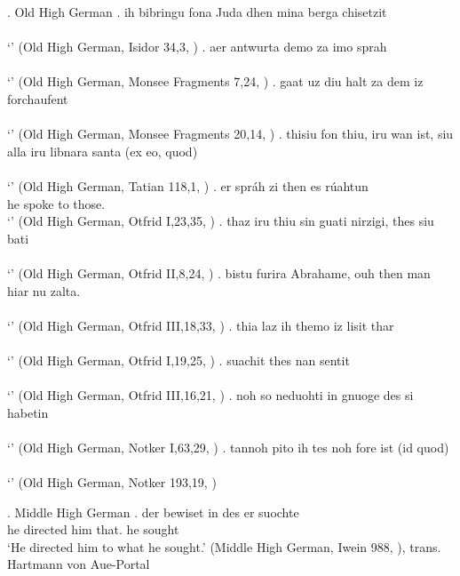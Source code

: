 \ex. Old High German
\ag. ih bibringu fona Juda dhen mina berga chisetzit\\
 \\
 `' \hfill (Old High German, Isidor 34,3, \citealt[761]{behaghel1923})
\bg. aer antwurta demo za imo sprah\\
 \\
 `' \hfill (Old High German, Monsee Fragments 7,24, \citealt[761]{behaghel1923})
\bg. gaat uz diu halt za dem iz forchaufent\\
 \\
 `' \hfill (Old High German, Monsee Fragments 20,14, \citealt[761]{behaghel1923})
\bg. thisiu fon thiu, iru wan ist, siu alla iru libnara santa (ex eo, quod)\\
 \\
 `' \hfill (Old High German, Tatian 118,1, \citealt[761]{behaghel1923})
\bg. er spráh zi then es rúahtun\\
 he spoke to those.\\
 `' \hfill (Old High German, Otfrid I,23,35, \citealt[761]{behaghel1923})
\bg. thaz iru thiu sin guati nirzigi, thes siu bati\\
 \\
 `' \hfill (Old High German, Otfrid II,8,24, \citealt[761]{behaghel1923})
\bg. bistu furira Abrahame, ouh then man hiar nu zalta.\\
 \\
 `' \hfill (Old High German, Otfrid III,18,33, \citealt[761]{behaghel1923})
\bg. thia laz ih themo iz lisit thar\\
 \\
 `' \hfill (Old High German, Otfrid I,19,25, \citealt[761]{behaghel1923})
\bg. suachit thes nan sentit\\
 \\
 `' \hfill (Old High German, Otfrid III,16,21, \citealt[761]{behaghel1923})
\bg. noh so neduohti in gnuoge des si habetin\\
 \\
 `' \hfill (Old High German, Notker I,63,29, \citealt[761]{behaghel1923})
\bg. tannoh pito ih tes noh fore ist (id quod)\\
 \\
 `' \hfill (Old High German, Notker 193,19, \citealt[761]{behaghel1923})


\ex. Middle High German
\ag. der bewiset in des er suochte\\
 he directed him {that}. he sought\\
 `He directed him to what he sought.' \hfill (Middle High German, Iwein 988, \citealt[761]{behaghel1923}), trans. Hartmann von Aue-Portal


